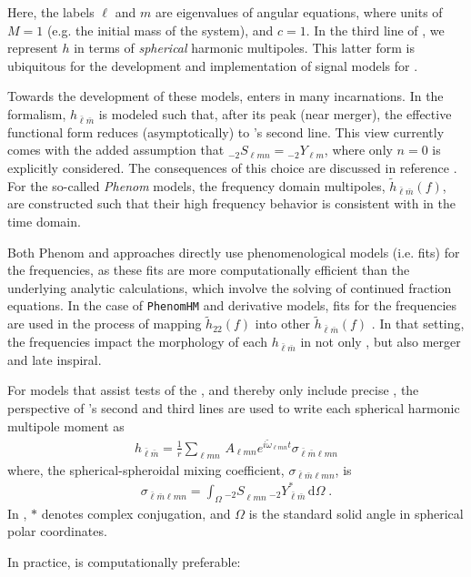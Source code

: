 \documentclass[twocolumn,aps,prd,floatfix,preprintnumbers,a4paper,nofootinbib,
superscriptaddress,10pt]{revtex4-1}
\def\check#1{\red{#1}}
\newcommand{\cw}{\tilde{\omega}}
\def\lmn{_{\ell m n}}
\def\LM{_{\bar{\ell} \bar{m}}}
\def\LMlmn{_{\bar{\ell} \bar{m} \ell m n}}
\begin{document}
%
Here, the labels $\ell$ and $m$ are eigenvalues of  angular equations, where units of $M=1$ (e.g. the initial mass of the \bbh{} system), and $c=1$.
%
In the third line of , we represent $h$ in terms of \textit{spherical} harmonic multipoles.
%
This latter form is ubiquitous for the development and implementation of \imr{} signal models for .
%
%
\par Towards the development of these models,  enters in many incarnations.
%
In the \eob{} formalism, $h\LM$ is modeled such that, after its peak (near merger), the effective functional form reduces (asymptotically) to 's second line.
%
This view currently comes with the added assumption that ${_{-2}}S_{\ell m n} = {_{-2}}Y_{\ell m}$, where only $n=0$ is explicitly considered.
%
The consequences of this choice are discussed in reference \check{[X]}.
%
For the so-called \textit{Phenom} models, the frequency domain multipoles, $\tilde{h}\LM(f)$, are constructed such that their high frequency behavior is consistent with  in the time domain.
%
\par Both Phenom and \eob{} approaches directly use phenomenological models (i.e. fits) for the \qnm{} frequencies, as these fits are more computationally efficient than the underlying analytic calculations, which involve the solving of continued fraction equations.
%
In the case of \texttt{PhenomHM} and derivative models, fits for the \qnm{} frequencies are used in the process of mapping $\tilde{h}_{22}(f)$ into other $\tilde{h}\LM(f)$ \check{[X]}.
%
In that setting, the \qnm{} frequencies impact the morphology of each $h\LM$ in not only \rd{}, but also merger and late inspiral.
%
%
\par For models that assist tests of the \nht{}, and thereby only include precise , the perspective of 's second and third lines are used to write each spherical harmonic multipole moment as
%
\begin{align}
	\label{hlm}
	h\LM = \frac{1}{r} \sum\lmn \, A\lmn e^{i \cw\lmn t} \sigma\LMlmn
\end{align}
%
where, the spherical-spheroidal mixing coefficient, $\sigma\LMlmn$, is
%
\begin{align}
		\label{sigma}
		\sigma\LMlmn = \int_{\Omega} {_{-2}S}\lmn \,  {_{-2}}Y^*\LM \, \mathrm{d} \Omega \; .
\end{align}
%
In , $*$ denotes complex conjugation, and $\Omega$ is the standard solid angle in spherical polar coordinates.
%
\par In practice,  is computationally preferable:
\end{document}
